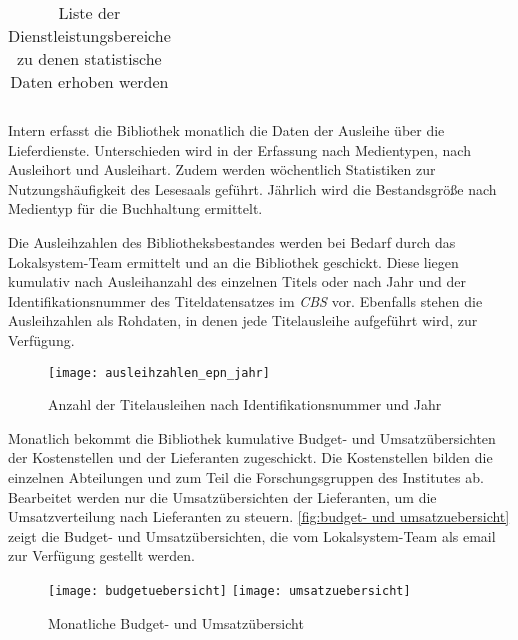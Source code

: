 \begin{table}[h]
\begin{adjustbox}{max width=\textwidth}
\begin{tabular}{lllclllcc}
        \bottomrule
    \end{tabular}
    \end{adjustbox}
    \caption{%
        Liste der Dienstleistungsbereiche zu denen statistische Daten erhoben werden
    \label{tab:Statistische_Daten}
    }
     \end{table}
\endgroup


Intern erfasst die Bibliothek monatlich die Daten der Ausleihe über die Lieferdienste. Unterschieden 
wird in der Erfassung nach Medientypen, nach Ausleihort und Ausleihart. Zudem werden wöchentlich 
Statistiken zur Nutzungshäufigkeit des Lesesaals geführt. Jährlich wird die Bestandsgröße nach 
Medientyp für die Buchhaltung ermittelt.

Die Ausleihzahlen des Bibliotheksbestandes werden bei Bedarf durch das Lokalsystem-Team ermittelt und an die Bibliothek geschickt. 
Diese liegen kumulativ nach Ausleihanzahl des einzelnen Titels oder nach Jahr und der Identifikationsnummer des Titeldatensatzes im 
\textit{\acrshort{CBS}} vor. Ebenfalls stehen die Ausleihzahlen als Rohdaten, in denen jede Titelausleihe aufgeführt wird, zur Verfügung.

\begin{figure}[h]
    \centering
        \texttt{[image: ausleihzahlen\_epn\_jahr]}
        \caption{Anzahl der Titelausleihen nach Identifikationsnummer und Jahr}
        \label{fig:Titelausleihen}
\end{figure}


Monatlich bekommt die Bibliothek kumulative Budget- und Umsatzübersichten der Kostenstellen und der Lieferanten zugeschickt. 
Die Kostenstellen bilden die einzelnen Abteilungen und zum Teil die Forschungsgruppen des Institutes ab. 
Bearbeitet werden nur die Umsatzübersichten der Lieferanten, um die Umsatzverteilung nach Lieferanten zu steuern.
\autoref{fig:budget- und umsatzuebersicht} zeigt die Budget- und Umsatzübersichten, die vom Lokalsystem-Team als email zur Verfügung gestellt werden.


\begin{figure}[h]
    \centering
        \texttt{[image: budgetuebersicht]}
        \texttt{[image: umsatzuebersicht]}
        \caption{Monatliche Budget- und Umsatzübersicht}
        \label{fig:budget- und umsatzuebersicht}
\end{figure}

